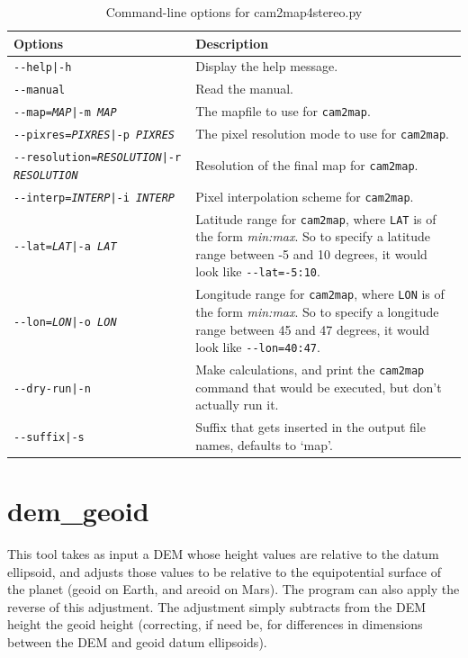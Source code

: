 \begin{longtable}{|l|p{10cm}|}
\caption{Command-line options for cam2map4stereo.py}
\label{tbl:bundlevis}
\endfirsthead
\endhead
\endfoot
\endlastfoot
\hline
Options & Description \\ \hline \hline
\texttt{-\/-help|-h} & Display the help message. \\ \hline
\texttt{-\/-manual} & Read the manual. \\ \hline
\texttt{-\/-map=\textit{MAP}|-m \textit{MAP}} & The mapfile to use for \texttt{cam2map}. \\ \hline
\texttt{-\/-pixres=\textit{PIXRES}|-p \textit{PIXRES}} & The pixel resolution mode to use for \texttt{cam2map}. \\ \hline
\texttt{-\/-resolution=\textit{RESOLUTION}|-r \textit{RESOLUTION}} & Resolution of the final map for \texttt{cam2map}. \\ \hline
\texttt{-\/-interp=\textit{INTERP}|-i \textit{INTERP}} & Pixel interpolation scheme for \texttt{cam2map}. \\ \hline
\texttt{-\/-lat=\textit{LAT}|-a \textit{LAT}} & Latitude range for \texttt{cam2map}, where \texttt{LAT} is of the form \textit{min:max}.  So to specify a latitude range between -5 and 10 degrees, it would look like \texttt{-\/-lat=-5:10}. \\ \hline
\texttt{-\/-lon=\textit{LON}|-o \textit{LON}} & Longitude range for \texttt{cam2map}, where \texttt{LON} is of the form \textit{min:max}.  So to specify a longitude range between 45 and 47 degrees, it would look like \texttt{-\/-lon=40:47}. \\ \hline
\texttt{-\/-dry-run|-n} & Make calculations, and print the \texttt{cam2map} command that would be executed, but don't actually run it.\\ \hline
\texttt{-\/-suffix|-s} & Suffix that gets inserted in the output file names, defaults to `map'.\\ \hline
\end{longtable}

\clearpage

\section{dem\_geoid}
\label{demgeoid}

This tool takes as input a DEM whose height values are relative to the
datum ellipsoid, and adjusts those values to be relative to the
equipotential surface of the planet (geoid on Earth, and areoid on
Mars). The program can also apply the reverse of this adjustment. The
adjustment simply subtracts from the DEM height the geoid height
(correcting, if need be, for differences in dimensions between the DEM
and geoid datum ellipsoids).


